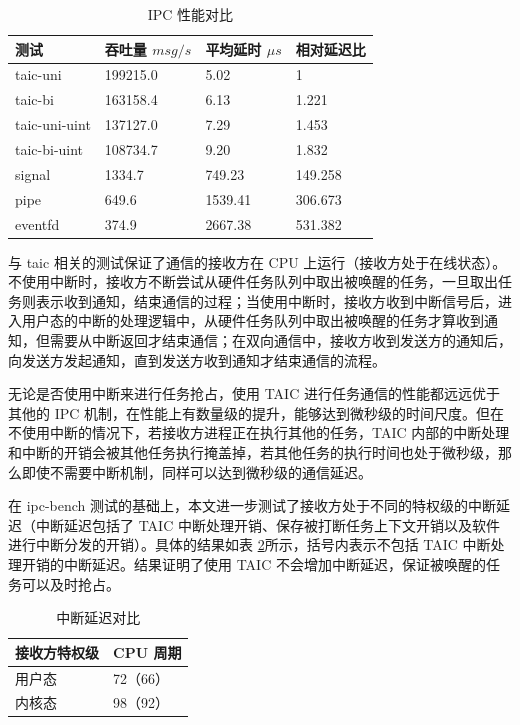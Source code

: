 \begin{table}
    \centering
    \caption{IPC 性能对比}
    \label{tab:ipc-bench}
    \begin{tabular}{llll}
        \toprule
        \textbf{测试} & \textbf{吞吐量 $msg/s$} & \textbf{平均延时 $\mu s$} & \textbf{相对延迟比} \\
        \midrule
        taic-uni & 199215.0 & 5.02 & 1 \\
        taic-bi & 163158.4 & 6.13 & 1.221 \\
        taic-uni-uint & 137127.0 & 7.29 & 1.453 \\
        taic-bi-uint & 108734.7 & 9.20 & 1.832 \\
        signal & 1334.7 & 749.23 & 149.258 \\
        pipe & 649.6 & 1539.41 & 306.673 \\
        eventfd & 374.9 & 2667.38 & 531.382 \\
        \bottomrule
    \end{tabular}
\end{table}

与 taic 相关的测试保证了通信的接收方在 CPU 上运行（接收方处于在线状态）。不使用中断时，接收方不断尝试从硬件任务队列中取出被唤醒的任务，一旦取出任务则表示收到通知，结束通信的过程；当使用中断时，接收方收到中断信号后，进入用户态的中断的处理逻辑中，从硬件任务队列中取出被唤醒的任务才算收到通知，但需要从中断返回才结束通信；在双向通信中，接收方收到发送方的通知后，向发送方发起通知，直到发送方收到通知才结束通信的流程。

无论是否使用中断来进行任务抢占，使用 TAIC 进行任务通信的性能都远远优于其他的 IPC 机制，在性能上有数量级的提升，能够达到微秒级的时间尺度。但在不使用中断的情况下，若接收方进程正在执行其他的任务，TAIC 内部的中断处理和中断的开销会被其他任务执行掩盖掉，若其他任务的执行时间也处于微秒级，那么即使不需要中断机制，同样可以达到微秒级的通信延迟。

在 ipc-bench 测试的基础上，本文进一步测试了接收方处于不同的特权级的中断延迟（中断延迟包括了 TAIC 中断处理开销、保存被打断任务上下文开销以及软件进行中断分发的开销）。具体的结果如表 \ref{tab:interrupt-latency}所示，括号内表示不包括 TAIC 中断处理开销的中断延迟。结果证明了使用 TAIC 不会增加中断延迟，保证被唤醒的任务可以及时抢占。

\begin{table}
    \centering
    \caption{中断延迟对比}
    \label{tab:interrupt-latency}
    \begin{tabular}{ll}
        \toprule
        \textbf{接收方特权级} & \textbf{CPU 周期} \\
        \midrule
        用户态 & 72（66） \\
        内核态 & 98（92） \\
        \bottomrule
    \end{tabular}
\end{table}

